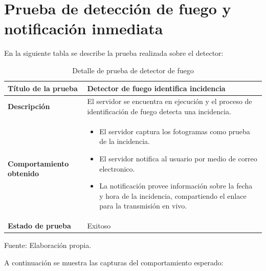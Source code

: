 \section{Prueba de detección de fuego y notificación inmediata}

En la siguiente tabla se describe la prueba realizada sobre el detector:\\

\begin{table}[H]
    \caption{Detalle de prueba de detector de fuego}
    \begin{center}
        \begin{tabular}{|>{\centering}p{}|m{}<{\centering}|} 
            \hline
            \textbf{Título de la prueba} & Detector de fuego identifica incidencia \\
            \hline
            \textbf{Descripción} & El servidor se encuentra en ejecución y el proceso de identificación de fuego detecta una incidencia.\\
            \hline
            \textbf{Comportamiento obtenido} & 
            \begin{itemize}
                \item El servidor captura los fotogramas como prueba de la incidencia.
                \item El servidor notifica al usuario por medio de correo electronico.
                \item La notificación provee información sobre la fecha y hora de la incidencia, compartiendo el enlace para la transmisión en vivo.
            \end{itemize} \\ 
            \hline
            \textbf{Estado de prueba} & Exitoso \\
            \hline
        \end{tabular}
    \end{center}
    \begin{center}
        Fuente: Elaboración propia.
    \end{center}
\end{table}

A continuación se muestra las capturas del comportamiento esperado:

